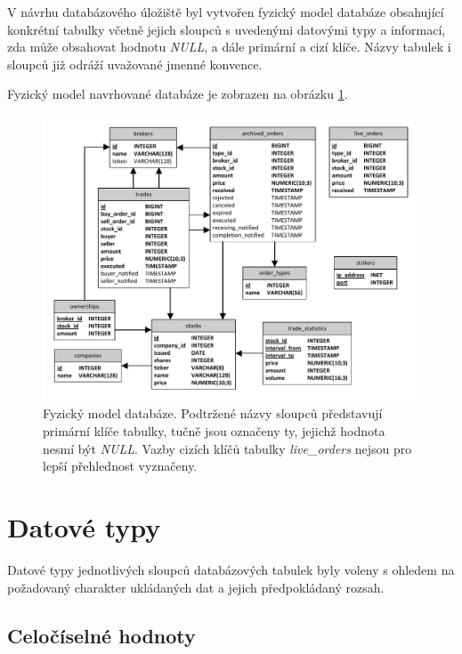 \documentclass[thesis=M,czech]{FITthesis}[2012/06/26]
\begin{document}
V návrhu databázového úložiště byl vytvořen fyzický model databáze obsahující konkrétní tabulky včetně jejich sloupců 
s uvedenými datovými typy a informací, zda může obsahovat hodnotu \textit{NULL}, a dále primární a cizí klíče. Názvy tabulek i sloupců 
již odráží uvažované jmenné konvence. \cite{umlsroz} %

Fyzický model navrhované databáze je zobrazen na obrázku \ref{fig:phy-model}. 

\begin{figure}\centering
	\includegraphics[width=\textwidth]{images/DB-phy-model} 
	\caption[Fyzický model databáze]{Fyzický model databáze. Podtržené názvy sloupců představují primární klíče tabulky, tučně jsou 
		označeny ty, jejichž hodnota nesmí být \textit{NULL}. Vazby cizích klíčů tabulky \textit{live\_orders} nejsou pro 
		lepší přehlednost vyznačeny.}\label{fig:phy-model}
\end{figure}


\section{Datové typy}

Datové typy jednotlivých sloupců databázových tabulek byly voleny s ohledem na požadovaný charakter ukládaných dat a jejich 
předpokládaný rozsah. 


\subsection{Celočíselné hodnoty}
\end{document}
